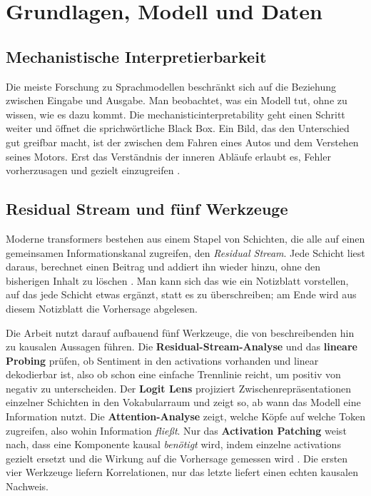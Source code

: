 \section{Grundlagen, Modell und Daten}

\subsection{Mechanistische Interpretierbarkeit}

Die meiste Forschung zu Sprachmodellen beschränkt sich auf die Beziehung zwischen Eingabe und Ausgabe. Man beobachtet, was ein Modell tut, ohne zu wissen, wie es dazu kommt. Die \gls{mechanisticinterpretability} geht einen Schritt weiter und öffnet die sprichwörtliche Black Box. Ein Bild, das den Unterschied gut greifbar macht, ist der zwischen dem Fahren eines Autos und dem Verstehen seines Motors. Erst das Verständnis der inneren Abläufe erlaubt es, Fehler vorherzusagen und gezielt einzugreifen \cite{nanda2023comprehensive}.

\subsection{Residual Stream und fünf Werkzeuge}

Moderne \glspl{transformer} bestehen aus einem Stapel von Schichten, die alle auf einen gemeinsamen Informationskanal zugreifen, den \emph{Residual Stream}. Jede Schicht liest daraus, berechnet einen Beitrag und addiert ihn wieder hinzu, ohne den bisherigen Inhalt zu löschen \cite{elhage2021mathematical}. Man kann sich das wie ein Notizblatt vorstellen, auf das jede Schicht etwas ergänzt, statt es zu überschreiben; am Ende wird aus diesem Notizblatt die Vorhersage abgelesen.

Die Arbeit nutzt darauf aufbauend fünf Werkzeuge, die von beschreibenden hin zu kausalen Aussagen führen. Die \textbf{Residual-Stream-Analyse} und das \textbf{lineare Probing} prüfen, ob Sentiment in den \glspl{activation} vorhanden und linear dekodierbar ist, also ob schon eine einfache Trennlinie reicht, um positiv von negativ zu unterscheiden. Der \textbf{Logit Lens} projiziert Zwischenrepräsentationen einzelner Schichten in den Vokabularraum \cite{nostalgebraist2020logit} und zeigt so, ab wann das Modell eine Information nutzt. Die \textbf{Attention-Analyse} zeigt, welche Köpfe auf welche Token zugreifen, also wohin Information \emph{fließt}. Nur das \textbf{Activation Patching} weist nach, dass eine Komponente kausal \emph{benötigt} wird, indem einzelne \glspl{activation} gezielt ersetzt und die Wirkung auf die Vorhersage gemessen wird \cite{meng2022locating, goldowskydill2023localizing}. Die ersten vier Werkzeuge liefern Korrelationen, nur das letzte liefert einen echten kausalen Nachweis.

